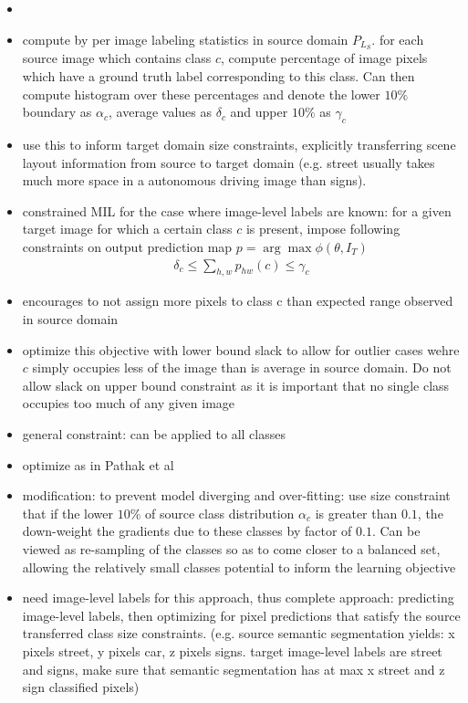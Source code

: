 \begin{itemize}
	\item {}
	\item compute by per image labeling statistics in source domain $P_{L_S}$. for each source image which contains class $c$, compute percentage of image pixels which have a ground truth label corresponding to this class. Can then compute histogram over these percentages and denote the lower $10\%$ boundary as $\alpha_c$, average values as $\delta_c$ and upper $10\%$ as $\gamma_c$
	\item use this to inform target domain size constraints, explicitly transferring scene layout information from source to target domain (e.g. street usually takes much more space in a autonomous driving image than signs).
	\item constrained MIL for the case where image-level labels are known: for a given target image for which a certain class $c$ is present, impose following constraints on output prediction map $p = \arg \max \phi (\theta, I_T)$
	\begin{align}
		\delta_c \leq \sum_{h,w} p_{hw}(c) \leq \gamma_c
	\end{align}
	\item encourages to not assign more pixels to class c than expected range observed in source domain
	\item optimize this objective with lower bound slack to allow for outlier cases wehre $c$ simply occupies less of the image than is average in source domain. Do not allow slack on upper bound constraint as it is important that no single class occupies too much of any given image
	\item general constraint: can be applied to all classes 
	\item optimize as in Pathak et al 
	\item modification: to prevent model diverging and over-fitting: use size constraint that if the lower $10\%$ of source class distribution $\alpha_c$ is greater than $0.1$, the down-weight the gradients due to these classes by factor of $0.1$. Can be viewed as re-sampling of the classes so as to come closer to a balanced set, allowing the relatively small classes potential to inform the learning objective
	\item need image-level labels for this approach, thus complete approach: predicting image-level labels, then optimizing for pixel predictions that satisfy the source transferred class size constraints. (e.g. source semantic segmentation yields: x pixels street, y pixels car, z pixels signs. target image-level labels are street and signs, make sure that semantic segmentation has at max x street and z sign classified pixels)

\end{itemize}

